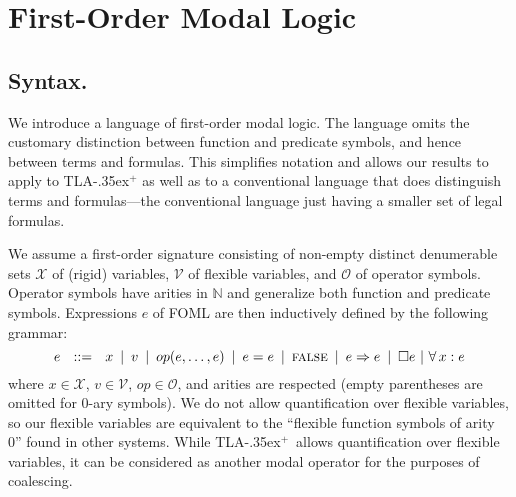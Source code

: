 \documentclass[a4paper,fleqn,envcountsame,orivec]{llncs}
\newcommand{\implies}{\Rightarrow}
\newcommand{\tlaplus}{\mbox{TLA\kern -.35ex$^+$}\xspace}
\newcommand{\nat}{\mathbb{N}}
\newcommand{\OO}{\mathcal{O}}
\newcommand{\VV}{\mathcal{V}}
\newcommand{\XX}{\mathcal{X}}
\newcommand{\edmargin}[2]{\marginpar{\raggedright\footnotesize\color{red}#1: #2}}
\newcommand{\edmargin}[2]{}
\def\llnote{\ednote{LL}}
\def\llmargin{\edmargin{LL}}
\def\smnote{\ednote{SM}}
\def\smmargin{\edmargin{SM}}
\begin{document}
%


\section{First-Order Modal Logic}
\label{sec:foml}
\subsection{Syntax.}

We introduce a language of first-order modal logic.
The language omits the
customary distinction between function and predicate symbols, and
hence between terms and formulas.  This simplifies notation and allows our
results to apply to \tlaplus as well as to a conventional language
that does distinguish terms and formulas---the conventional
language just having a smaller set
of legal formulas.

We assume a first-order signature consisting of non-empty distinct denumerable sets
$\XX$ of (rigid) variables, $\VV$ of flexible variables, and $\OO$ of operator symbols.
Operator symbols have arities in $\nat$ and generalize both function and predicate symbols.
Expressions $e$ of FOML are then inductively defined by the following grammar:
%
 \[
  e\ \ ::=\ \
  x\ \,|\,\
  v\ \,|\,\
  op(e,\ldots,e)\ \,|\,\
  e = e\ \,|\,\
  \FALSE\ \,|\,\
  e \implies e\ \,|\,\
  \Box e\ |\
  \A x: e
 \]
%
%
where $x \in \XX$, $v \in \VV$, $op \in \OO$, and arities are
respected (empty parentheses are omitted for $0$-ary symbols).  We do
not allow quantification over flexible variables, so our flexible
variables are equivalent to the ``flexible function symbols of arity
0'' found in other systems.
While \tlaplus\ allows quantification
over flexible variables,
it can be considered as another modal operator for the purposes of coalescing.
\end{document}
